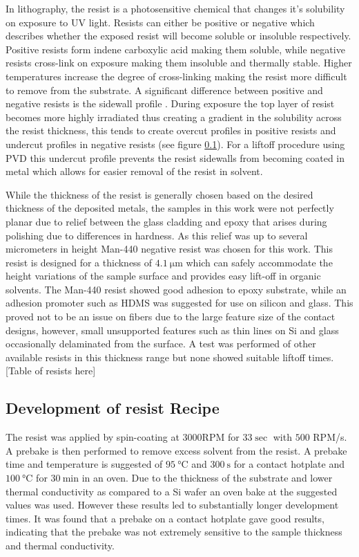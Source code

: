 In lithography, the resist is a photosensitive chemical that changes it's solubility on exposure to UV light. Resists can either be positive or negative which describes whether the exposed resist will become soluble or insoluble respectively. Positive resists form  indene carboxylic acid making them soluble, while negative resists cross-link on exposure making them insoluble and thermally stable. Higher temperatures increase the degree of cross-linking making the resist more difficult to remove from the substrate. A significant difference between positive and negative resists is the sidewall profile . During exposure the top layer of resist becomes more highly irradiated thus creating a gradient in the solubility across the resist thickness, this tends to create overcut profiles in positive resists and undercut profiles in negative resists (see figure \ref{}). For a liftoff procedure using PVD this undercut profile prevents the resist sidewalls from becoming coated in metal which allows for easier removal of the resist in solvent. 

While the thickness of the resist is generally chosen based on the desired thickness of the deposited metals, the samples in this work were not perfectly planar due to relief between the glass cladding and epoxy that arises during polishing due to differences in hardness. As this relief was up to several micrometers in height Man-440 negative resist was chosen for this work. This resist is designed for a thickness of $\SI{4.1}{\micro \meter}$ which can safely accommodate the height variations of the sample surface and provides easy lift-off in organic solvents. The Man-440 resist showed good adhesion to epoxy substrate, while an adhesion promoter such as HDMS was suggested for use on silicon and glass. This proved not to be an issue on fibers due to the large feature size of the contact designs, however, small unsupported features such as thin lines on Si and glass occasionally delaminated from the surface. A test was performed of other available resists in this thickness range but none showed suitable liftoff times. [Table of resists here] 


\subsection{Development of resist Recipe}
The resist was applied by spin-coating at $3000$RPM for $33 \si{\sec}$ with $500$ RPM/s. A prebake is then performed to remove excess solvent from the resist. A prebake time and temperature is suggested of $\SI{95}{\celsius}$ and $\SI{300}{\second}$ for a contact hotplate and $\SI{100}{\celsius}$ for  $\SI{30}{\minute}$ in an oven.  Due to the thickness of the substrate and lower thermal conductivity as compared to a Si wafer an oven bake at the suggested values was used. However these results led to substantially longer development times. It was found that a prebake on a contact hotplate gave good results, indicating that the prebake was not extremely sensitive to the sample thickness and thermal conductivity. 

